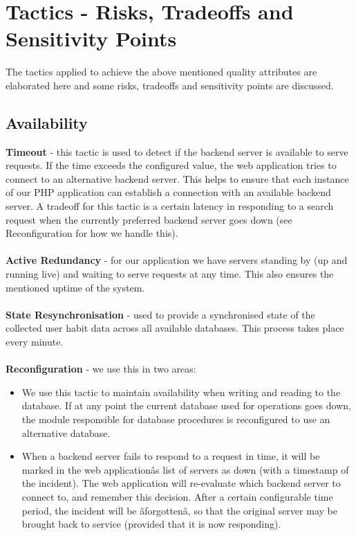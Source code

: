 \hypertarget{tactics}{
\section{Tactics - Risks, Tradeoffs and Sensitivity Points}}
The tactics applied to achieve the above mentioned quality attributes are
elaborated here and some risks, tradeoffs and sensitivity points are discussed.

\subsection{Availability}
\textbf{Timeout} - this tactic is used to detect if the backend server is
available to serve requests. If the time exceeds the configured value, the web
application tries to connect to an alternative backend server. This helps to
ensure that each instance of our PHP application can establish a connection with
an available backend server. \newline
A tradeoff for this tactic is a certain latency in responding to a search
request when the currently preferred backend server goes down
(see Reconfiguration for how we handle this). \\ \\
\textbf{Active Redundancy} - for our application we have servers standing by
(up and running live) and waiting to serve requests at any time. This also
ensures the mentioned uptime of the system. \\ \\
\textbf{State Resynchronisation} - used to provide a synchronised state of the
collected user habit data across all available databases. This process takes
place every minute. \\ \\
\textbf{Reconfiguration} - we use this in two areas:
\begin{itemize}
  \item We use this tactic to maintain availability when writing and reading to
     the database. If at any point the current database used for operations goes
     down, the module responsible for database procedures is reconfigured to use
     an alternative database.
  \item When a backend server fails to respond to a request in time, it will be
     marked in the web applicationâs list of servers as down (with a timestamp
     of the incident). The web application will re-evaluate which backend server
     to connect to, and remember this decision. After a certain configurable
     time period, the incident will be âforgottenâ, so that the original server
     may be brought back to service (provided that it is now responding).
\end{itemize}

